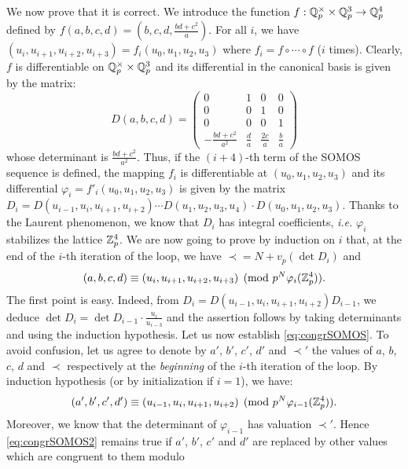 \documentclass{lms}
\begin{document}
We now prove that it is correct.
We introduce the function $f : \mathbb Q_p^\times \times \mathbb Q_p^3 \to \mathbb Q_p^4$ defined by 
$f(a,b,c,d) = (b,c,d,\frac{bd+c^2}a)$. For all $i$, we have 
$(u_i, u_{i+1}, u_{i+2}, u_{i+3}) = f_i(u_0, u_1, u_2, u_3)$ where $f_i
= f \circ \cdots \circ f$ ($i$ times). Clearly, $f$ is  
differentiable on $\mathbb Q_p^\times \times \mathbb Q_p^3$ and its differential in the 
canonical basis is given by the matrix:
$$D(a,b,c,d) = \begin{pmatrix}
0 & 1 & 0 & 0 \\
0 & 0 & 1 & 0 \\
0 & 0 & 0 & 1 \\
-\frac{bd+c^2}{a^2} & \frac d a & \frac {2c} a & \frac b a
\end{pmatrix}$$
whose determinant is $\frac{bd+c^2}{a^2}$. Thus, if the $(i+4)$-th term 
of the SOMOS sequence is defined, the mapping $f_i$ is differentiable
at $(u_0, u_1, u_2, u_3)$ and its differential $\varphi_i = 
f'_i(u_0, u_1, u_2, u_3)$ is given by the matrix
$D_i = D(u_{i-1}, u_i, u_{i+1}, u_{i+2}) \cdots
D(u_1, u_2, u_3, u_4) \cdot D(u_0, u_1, u_2, u_3)$.
Thanks to the Laurent phenomenon, we know that $D_i$ has
integral coefficients, \emph{i.e.} $\varphi_i$ stabilizes the lattice
$\mathbb Z_p^4$.
We are now going to prove by induction on $i$ that, at the end of the 
$i$-th iteration of the loop, we have $\prec = N + v_p(\det D_i)$ and
\begin{equation}
\label{eq:congrSOMOS}
(a, b, c, d) \equiv (u_i, u_{i+1}, u_{i+2}, u_{i+3}) \pmod
{p^N \varphi_i(\mathbb Z_p^4)}.
\end{equation}
The first point is easy. Indeed, from $D_i = D(u_{i-1}, u_i, u_{i+1}, 
u_{i+2}) D_{i-1}$, we deduce $\det D_i = \det D_{i-1} \cdot 
\frac{u_i}{u_{i-3}}$ and the assertion follows by taking determinants
and using the induction hypothesis. 
Let us now establish \eqref{eq:congrSOMOS}. To avoid confusion, 
let us agree to denote by $a'$, $b'$, $c'$, $d'$ and $\prec'$ the values of 
$a$, $b$, $c$, $d$ and $\prec$ respectively at the \emph{beginning} of 
the $i$-th iteration of the loop. By induction hypothesis (or by 
initialization if $i = 1$), we have:
\begin{equation}
\label{eq:congrSOMOS2}
(a', b', c', d') \equiv (u_{i-1}, u_i, u_{i+1}, u_{i+2}) \pmod
{p^N \varphi_{i-1}(\mathbb Z_p^4)}.
\end{equation}
Moreover, we know that the determinant of $\varphi_{i-1}$ has valuation
$\prec'$. Hence \eqref{eq:congrSOMOS2} remains true if $a'$, $b'$, $c'$
and $d'$ are replaced by other values which are congruent to them modulo
\end{document}
